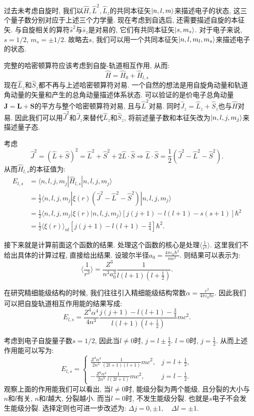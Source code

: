 过去未考虑自旋时, 我们以$\hat{H}, \hat{L}^2, \hat{L}_z$的共同本征矢$\ket{n, l, m}$来描述电子的状态, 这三个量子数分别对应于上述三个力学量. 现在考虑到自选后, 还需要描述自旋的本征矢. 与自旋相关的算符$\hat{s}^2$与$\hat{s}_z$是对易的, 它们有共同本征矢$\ket{s, m_s}$. 对于电子来说, $s=1/2$, $m_s=\pm 1/2$. 故略去$s$, 我们可以用一个共同本征矢$\ket{n, l, m_l, m_s}$来描述电子的状态.

完整的哈密顿算符应该考虑到自旋-轨道相互作用, 从而:
\[
\hat{H} = \hat{H}_0 + \hat{H}_{l, s}
\]
现在$\hat{L}_z$和$\hat{S}_z$都不再与上述哈密顿算符对易. 一个自然的想法是用自旋角动量和轨道角动量的矢量和产生的总角动量描述体系状态. 可以验证的是价电子总角动量$\bm{J}=\bm{L}+\bm{S}$的平方与整个哈密顿算符对易, 且与$\hat{L}^2$对易. 同时$\hat{J}_z=\hat{L}_z+\hat{S}_z$也与$\hat{H}$对易. 因此我们可以用$\hat{J}^2$和$\hat{J}_z$来替代$\hat{L}_z$和$\hat{S}_z$, 将前述量子数和本征矢改为$\ket{n, l, j, m_j}$来描述量子态.

考虑
\[
\hat{J}^2 = (\hat{L}+\hat{S})^2 = \hat{L}^2 + \hat{S}^2 + 2\hat{L}\cdot\hat{S} \Rightarrow \hat{L}\cdot\hat{S} = \frac{1}{2}(\hat{J}^2 - \hat{L}^2 - \hat{S}^2).
\]
从而$\hat{H}_{l, s}$的本征值为:
\[
\begin{aligned}
E_{l, s} &= \langle n, l, j, m_j|\hat{H}_{l, s}|n, l, j, m_j\rangle \\
&= \frac{1}{2}\langle n, l, j, m_j|\xi(r)(\hat{J}^2 - \hat{L}^2 - \hat{S}^2)|n, l, j, m_j\rangle \\
& = \frac{1}{2}\langle n, l, j, m_j|\xi(r)|n, l, j, m_j\rangle [j(j+1) - l(l+1) - s(s+1)]\hbar^2 \\
& = \frac12\langle\xi(r)\rangle_{nl}[j(j+1) - l(l+1) - \frac{3}{4}]\hbar^2.
\end{aligned}
\]

接下来就是计算前面这个函数的结果. 处理这个函数的核心是处理$\langle \frac{1}{r^3} \rangle$. 这里我们不给出具体的计算过程, 直接给出结果. 设玻尔半径$a_0=\frac{4\pi \varepsilon_0 \hbar^2}{m e^2}$. 则结果可以表示为:
\[
\langle \frac{1}{r^3} \rangle = \frac{Z^3}{n^3 a_0^3} \frac{1}{l(l+1)(l+\frac{1}{2})}.
\]

在研究精细能级结构的时候, 我们往往引入精细能级结构常数$\alpha=\frac{e^2}{4\pi \varepsilon_0 \hbar c}$. 因此我们可以把自旋轨道相互作用能的结果写成:
\[
E_{l, s} = \frac{Z^4 \alpha^4}{4 n^3} \frac{j(j+1) - l(l+1) - \frac{3}{4}}{l(l+1)(l+\frac{1}{2})} m c^2.
\]

考虑到电子自旋量子数$s=1/2$, 因此当$l\neq 0$时, $j=l\pm \frac{1}{2}$. $l=0$时, $j=\frac{1}{2}$. 从而上述作用能可以写为:
\[
E_{l, s} =
\begin{cases}
\frac{Z^4 \alpha^4}{2 n^3} \frac{1}{(2l+1)(l+1)} m c^2, & j=l+\frac{1}{2}, \\
-\frac{Z^4 \alpha^4}{2 n^3} \frac{1}{l(2l+1)} m c^2, & j=l-\frac{1}{2}.
\end{cases}
\]
观察上面的作用能我们可以看出, 当$l\neq 0$时, 能级分裂为两个能级, 且分裂的大小与$n$和$l$有关, $n$和$l$越大, 分裂越小. 而当$l=0$时, 不发生能级分裂. 也就是$s$电子不会发生能级分裂. 选择定则也可进一步改述为: $\Delta j = 0, \pm 1, \quad \Delta l = \pm 1$.

